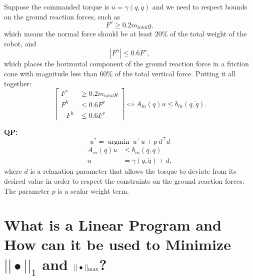 Suppose the commanded torque is $u=\gamma(q,\dot{q})$ and we need to respect bounds on the ground reaction forces, such as
        \begin{equation*}
            F^v \geq 0.2m_{total}g,
        \end{equation*}
which means the normal force should be at least $20\%$ of the total weight of the robot, and 
        \begin{equation*}
            |F^h| \leq 0.6F^v,
        \end{equation*}
which places the horizontal component of the ground reaction force in a friction cone with magnitude less than $60\%$ of the total vertical force. Putting it all together:
        \begin{equation*}
            \left[ \begin{array}{rl}
		        F^v &\geq 0.2m_{total}g\\
                F^h  & \leq 0.6F^v\\
                -F^h &\leq 0.6F^v\end{array} \right]
                \iff A_{in} (q)u\leq b_{in}(q,\dot{q}).
        \end{equation*}

    \textbf{QP:}
    \begin{equation*}
        u^\ast = \operatorname{argmin}\ u^\top u + p\ d^\top d
    \end{equation*}
    \begin{align*}
        A_{in}(q)u & \leq b_{in}(q,\dot q) \\
         u& = \gamma(q, \dot{q})+d,
    \end{align*}
where $d$ is a relaxation parameter that allows the torque to deviate from its desired value in order to respect the constraints on the ground reaction forces. The parameter $p$ is a scalar weight term.

\section{What is a Linear Program and How can it be used to Minimize $|| \bullet||_1$ and $|| \bullet||_{\rm max}$?}

